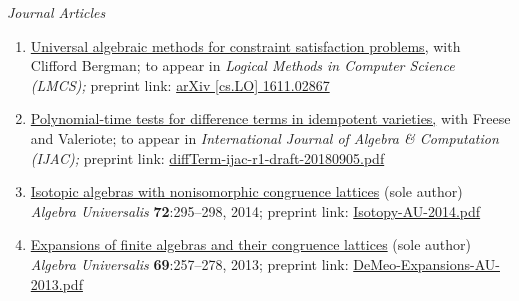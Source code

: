 \newcommand\mmskip{-6mm}

\newcommand\pubitem[6]{\item \href{#5}{#1} #2 \textit{#3} #4 preprint link: \href{#5}{#6}}

    {\it Journal Articles}%
    \begin{enumerate}
        \pubitem
        {Universal algebraic methods for constraint satisfaction problems,}
        {with Clifford Bergman; to appear in}
        {Logical Methods in Computer Science {\small (LMCS)};}
        {}
        {https://arxiv.org/abs/1611.02867}
        {arXiv [cs.LO] 1611.02867}
        
        \pubitem
      {Polynomial-time tests for difference terms in idempotent varieties,}
      {with Freese and Valeriote; to appear in}
      {International Journal of Algebra \& Computation {\small (IJAC)};}
      {}
      {https://github.com/UniversalAlgebra/term-conditions/blob/master/ijac/diffTerm-ijac-r1-draft-20180905.pdf}
      {diffTerm-ijac-r1-draft-20180905.pdf}
      
      \pubitem 
      {Isotopic algebras with nonisomorphic congruence lattices}
      {(sole author)}  %
      {Algebra Universalis}
      {\textbf{72}:295--298, 2014;} 
      {https://github.com/williamdemeo/Isotopy/blob/master/Isotopy-AU-2014.pdf}
      {Isotopy-AU-2014.pdf}
      
      
      \pubitem 
      {Expansions of finite algebras and their congruence lattices}
      {(sole author)}
      {Algebra Universalis}
      {\textbf{69}:257--278, 2013;}
      {https://github.com/williamdemeo/Overalgebras/blob/master/DeMeo-Expansions-AU-2013.pdf}
      {DeMeo-Expansions-AU-2013.pdf}

\end{enumerate}


